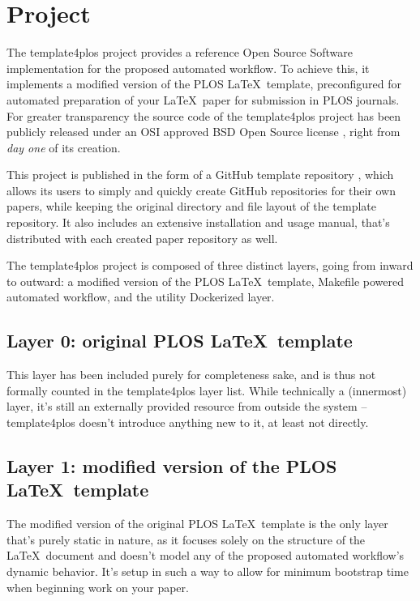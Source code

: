 \section*{Project }

The template4plos project \cite{template4plos} provides a reference Open Source Software implementation for the proposed automated workflow.
To achieve this, it implements a modified version of the PLOS \LaTeX~template, preconfigured for automated preparation of your \LaTeX~paper for submission in PLOS journals.
For greater transparency the source code of the template4plos project \cite{template4plos} has been publicly released under an OSI approved BSD Open Source license \cite{OSI:BSD}, right from \emph{day one} of its creation.

This project is published in the form of a GitHub template repository \cite{GitHub:help:repository_template}, which allows its users to simply and quickly create GitHub repositories for their own papers, while keeping the original directory and file layout of the template repository.
It also includes an extensive installation and usage manual, that's distributed with each created paper repository as well.

The template4plos project is composed of three distinct layers, going from inward to outward: a modified version of the PLOS \LaTeX~template, Makefile powered automated workflow, and the utility Dockerized layer.

\subsection*{Layer 0: original PLOS \LaTeX~template}

This layer has been included purely for completeness sake, and is thus not formally counted in the template4plos layer list.
While technically a (innermost) layer, it's still an externally provided resource \cite{PLOS:LaTeX} from outside the system -- template4plos doesn't introduce anything new to it, at least not directly.

\subsection*{Layer 1: modified version of the PLOS \LaTeX~template}

The modified version of the original PLOS \LaTeX~template is the only layer that's purely static in nature, as it focuses solely on the structure of the \LaTeX~document and doesn't model any of the proposed automated workflow's dynamic behavior.
It's setup in such a way to allow for minimum bootstrap time when beginning work on your paper.

